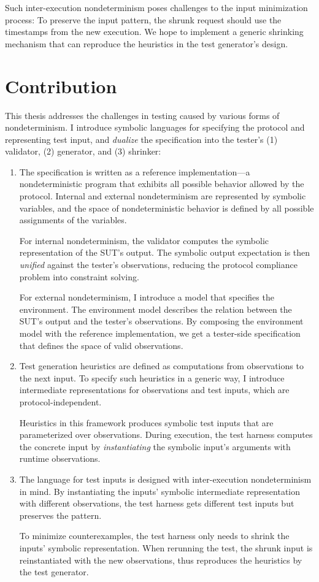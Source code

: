 Such inter-execution nondeterminism poses challenges to the input minimization
process: To preserve the input pattern, the shrunk \http request should use the
timestamps from the new execution.  We hope to implement a generic shrinking
mechanism that can reproduce the heuristics in the test generator's design.

\section{Contribution}
\label{sec:contribution}
This thesis addresses the challenges in testing caused by various forms of
nondeterminism.  I introduce symbolic languages for specifying the protocol and
representing test input, and {\em dualize} the specification into the tester's
(1) validator, (2) generator, and (3) shrinker:

\begin{enumerate}
\item The specification is written as a reference implementation---a
  nondeterministic program that exhibits all possible behavior allowed by the
  protocol.  Internal and external nondeterminism are represented by symbolic
  variables, and the space of nondeterministic behavior is defined by all
  possible assignments of the variables.

  For internal nondeterminism, the validator computes the symbolic
  representation of the SUT's output.  The symbolic output expectation is then
  {\em unified} against the tester's observations, reducing the protocol
  compliance problem into constraint solving.

  For external nondeterminism, I introduce a model that specifies the
  environment.  The environment model describes the relation between the SUT's
  output and the tester's observations.  By composing the environment model with
  the reference implementation, we get a tester-side specification that defines
  the space of valid observations.
\item Test generation heuristics are defined as computations from observations
  to the next input.  To specify such heuristics in a generic way, I introduce
  intermediate representations for observations and test inputs, which are
  protocol-independent.

  Heuristics in this framework produces symbolic test inputs that are
  parameterized over observations.  During execution, the test harness computes
  the concrete input by {\em instantiating} the symbolic input's arguments with
  runtime observations.
\item The language for test inputs is designed with inter-execution
  nondeterminism in mind.  By instantiating the inputs' symbolic intermediate
  representation with different observations, the test harness gets different
  test inputs but preserves the pattern.

  To minimize counterexamples, the test harness only needs to shrink the inputs'
  symbolic representation.  When rerunning the test, the shrunk input is
  reinstantiated with the new observations, thus reproduces the heuristics by
  the test generator.
\end{enumerate}

